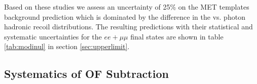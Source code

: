 \newcommand{\systpercentage}{25\% }

Based on these studies we assess an uncertainty of \systpercentage
on the MET templates background prediction
which is dominated by the difference in the \Z vs. photon hadronic recoil \pt distributions.
The resulting predictions with their statistical and systematic uncertainties for the $ee+\mu\mu$ 
final states are shown in table \ref{tab:modinul} in section \ref{sec:upperlimit}.

\subsection{Systematics of OF Subtraction}
\label{sec:systematicsof}

\newcommand{\ofsystpercentage}{9\% }

